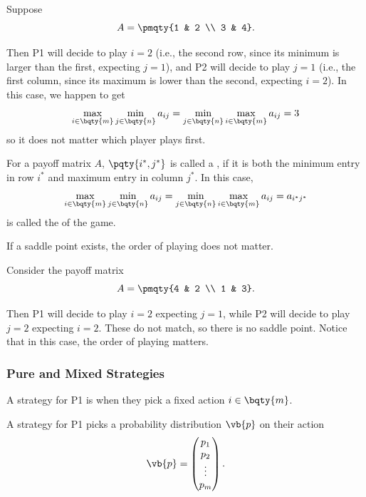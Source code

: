 \begin{example}
    Suppose
    \[
        A = \pmqty{1 & 2 \\ 3 & 4}.
    \]

    Then P1 will decide to play \(i = 2\) (i.e., the second row, since its minimum is larger than the first, expecting \(j = 1\)), and P2 will decide to play \(j = 1\) (i.e., the first column, since its maximum is lower than the second, expecting \(i = 2\)). In this case, we happen to get
    \[
        \max_{i \in \bqty{m}} \min_{j \in \bqty{n}} a_{ij} = \min_{j \in \bqty{n}} \max_{i \in \bqty{m}} a_{ij} = 3
    \]
    so it does not matter which player plays first.
\end{example}

\begin{definition}
    For a payoff matrix \(A\), \(\pqty{i^{\ast}, j^{\ast}}\) is called a , if it is both the minimum entry in row \(i^{\ast}\) and maximum entry in column \(j^{\ast}\). In this case,
    \[
        \max_{i \in \bqty{m}} \min_{j \in \bqty{n}} a_{ij} = \min_{j \in \bqty{n}} \max_{i \in \bqty{m}} a_{ij} = a_{i^{\ast}j^{\ast}}
    \]
    is called the  of the game.
\end{definition}

If a saddle point exists, the order of playing does not matter.

\begin{example}
    Consider the payoff matrix
    \[
        A = \pmqty{4 & 2 \\ 1 & 3}.
    \]

    Then P1 will decide to play \(i = 2\) expecting \(j = 1\), while P2 will decide to play \(j = 2\) expecting \(i = 2\). These do not match, so there is no saddle point. Notice that in this case, the order of playing matters.
\end{example}

\subsubsection{Pure and Mixed Strategies}

\begin{definition}
    A  strategy for P1 is when they pick a fixed action \(i \in \bqty{m}\).

    A  strategy for P1 picks a probability distribution \(\vb{p}\) on their action
    \[
        \vb{p} = \begin{pmatrix}
            p_1 \\ p_2 \\ \vdots \\ p_m
        \end{pmatrix}.
    \]
\end{definition}

